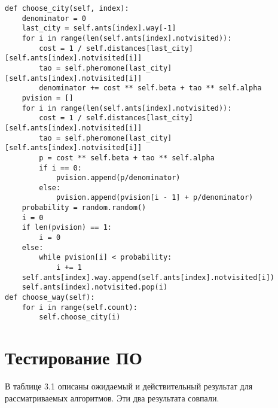 \begin{lstlisting}[caption=Функции выбора следующего города для муравьёв]
def choose_city(self, index):
	denominator = 0
	last_city = self.ants[index].way[-1]
	for i in range(len(self.ants[index].notvisited)):
		cost = 1 / self.distances[last_city][self.ants[index].notvisited[i]]
		tao = self.pheromone[last_city][self.ants[index].notvisited[i]]
		denominator += cost ** self.beta + tao ** self.alpha
	pvision = []
	for i in range(len(self.ants[index].notvisited)):
		cost = 1 / self.distances[last_city][self.ants[index].notvisited[i]]
		tao = self.pheromone[last_city][self.ants[index].notvisited[i]]
		p = cost ** self.beta + tao ** self.alpha
		if i == 0:
			pvision.append(p/denominator)
		else:
			pvision.append(pvision[i - 1] + p/denominator)
	probability = random.random()
	i = 0
	if len(pvision) == 1:
		i = 0
	else:
		while pvision[i] < probability:
			i += 1
	self.ants[index].way.append(self.ants[index].notvisited[i])
	self.ants[index].notvisited.pop(i)
def choose_way(self):
	for i in range(self.count):
		self.choose_city(i)
\end{lstlisting}
\captionsetup{singlelinecheck = false, justification=centering}

\section{Тестирование ПО}

В таблице 3.1 описаны ожидаемый и действительный результат для рассматриваемых алгоритмов. Эти два результата совпали.

